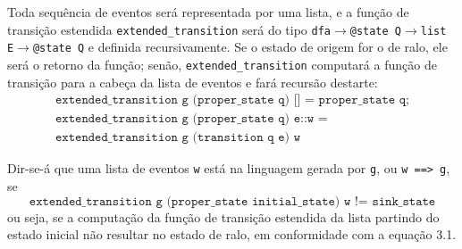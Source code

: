 
Toda sequência de eventos será representada por uma lista, e a função de transição estendida \texttt{extended\_transition} será do tipo \texttt{dfa$\rightarrow$@state Q$\rightarrow$list E$\rightarrow$@state Q} e definida recursivamente. Se o estado de origem for o de ralo, ele será o retorno da função; senão, \texttt{extended\_transition} computará a função de transição para a cabeça da lista de eventos e fará recursão destarte: \begin{gather*}
\texttt{extended\_transition g (proper\_state q) [] = proper\_state q;}\\\texttt{extended\_transition g (proper\_state q) e::w =}\\\texttt{extended\_transition g (transition q e) w}\end{gather*}

Dir-se-á que uma lista de eventos \texttt{w} está na linguagem gerada por \texttt{g}, ou \texttt{w ==> g}, se $$\texttt{extended\_transition g (proper\_state initial\_state) w != sink\_state}$$ ou seja, se a computação da função de transição estendida da lista partindo do estado inicial não resultar no estado de ralo, em conformidade com a equação 3.1.